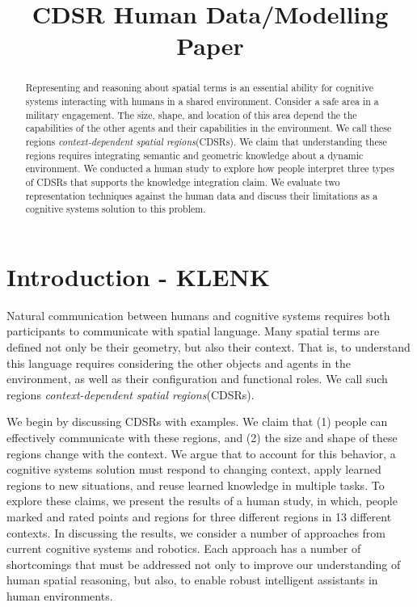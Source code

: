 \documentclass[11pt,letterpaper]{article}
\begin{document}
 

\title{CDSR Human Data/Modelling Paper}
 
\vskip 0.2in
 
\begin{abstract}
Representing and reasoning about spatial terms is an essential ability for cognitive systems interacting with humans in a shared environment.  Consider a safe area in a military engagement.  The size, shape, and location of this area depend the the capabilities of the other agents and their capabilities in the environment.  We call these regions \textit{context-dependent spatial regions}(CDSRs).  We claim that understanding these regions requires integrating semantic and geometric knowledge about a dynamic environment.  We conducted a human study to explore how people interpret three types of CDSRs that supports the knowledge integration claim.  We evaluate two representation techniques against the human data and discuss their limitations as a cognitive systems solution to this problem.
\end{abstract}

\section{Introduction - KLENK} 
Natural communication between humans and cognitive systems requires both participants to communicate with spatial language.  Many spatial terms are defined not only be their geometry, but also their context.  That is, to understand this language requires considering the other objects and agents in the environment, as well as their configuration and functional roles.  We call such regions \textit{context-dependent spatial regions}(CDSRs).

We begin by discussing CDSRs with examples.  We claim that (1) people can effectively communicate with these regions, and (2) the size and shape of these regions change with the context.  We argue that to account for this behavior, a cognitive systems solution must respond to changing context, apply learned regions to new situations, and reuse learned knowledge in multiple tasks.  To explore these claims, we present the results of a human study, in which, people marked and rated points and regions for three different regions in 13 different contexts.  In discussing the results, we consider a number of approaches from current cognitive systems and robotics.  Each approach has a number of shortcomings that must be addressed not only to improve our understanding of human spatial reasoning, but also, to enable robust intelligent assistants in human environments.
\end{document}

